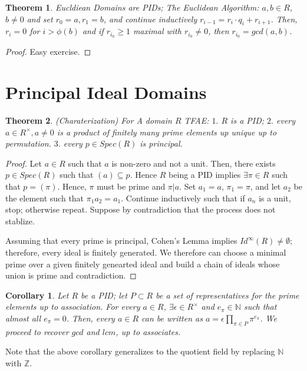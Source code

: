 \documentclass{article}
\newtheorem{theorem}{Theorem}[section]
\newtheorem{corollary}{Corollary}[theorem]
\begin{document}
\begin{theorem}
    Eucldiean Domains are PIDs; The Euclidean Algorithm: $a,b\in R$, $b\neq 0$ and set $r_0=a,r_1=b$, and continue inductively $r_{i-1}=r_i\cdot q_i+r_{i+1}$. Then, $r_i=0$ for $i>\phi(b)$ and if $r_{i_0}\geq 1$ maximal with $r_{i_0}\neq 0$, then $r_{i_0}=gcd(a,b)$.
\end{theorem}
\begin{proof}
    Easy exercise.
\end{proof}

\section{Principal Ideal Domains}
\begin{theorem}
    (Charaterization) For A domain $R$ TFAE: $1.$ $R$ is a PID; $2.$ every $a\in R^{\times}, a\neq 0$ is a product of finitely many prime elements up unique up to permutation. $3.$ every $p\in Spec(R)$ is principal. 
\end{theorem}

\begin{proof}
    Let $a\in R$ such that $a$ is non-zero and not a unit. Then, there exists $p\in Spec(R)$ such that $(a)\subseteq p$. Hence $R$ being a PID implies $\exists \pi\in R $ such that $p=(\pi)$. Hence, $\pi$ must be prime and $\pi|a$. Set $a_1=a$, $\pi_1=\pi$, and let $a_2$ be the element such that $\pi_1a_2=a_1$. Continue inductively such that if $a_n$ is a unit, stop; otherwise repeat. Suppose by contradiction that the process does not stablize.

    Assuming that every prime is principal, Cohen's Lemma implies $Id^{\infty}(R)\neq \emptyset$; therefore, every ideal is finitely generated. We therefore can choose a minimal prime over a given finitely genearted ideal and build a chain of ideals whose union is prime and contradiction. 
\end{proof}
\begin{corollary}
    Let $R$ be a PID; let $P\subset R$ be a set of representatives for the prime elements up to association. For every $a\in R$, $\exists \epsilon\in R^{\times} $ and $e_{\pi}\in \mathbb{N} $ such that almost all $e_{\pi}=0$. Then, every $a\in R$ can be written as $a=\epsilon\prod_{\pi\in P}\pi^{e_{\pi}}$. We proceed to recover $gcd$ and $lcm$, up to associates. 
\end{corollary}
Note that the above corollary generalizes to the quotient field by replacing $\mathbb{N}$ with $\mathbb{Z}$.
\end{document}
